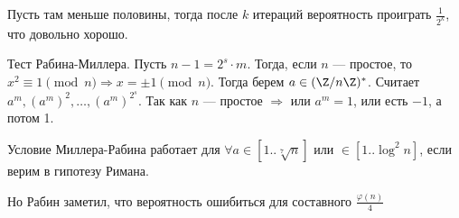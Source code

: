 Пусть там меньше половины, тогда после $k$ итераций вероятность проиграть  $\frac{1}{2^k}$, что довольно хорошо.

Тест Рабина-Миллера. Пусть $n-1 = 2^s \cdot m$. Тогда, если  $n$ --- простое, то  $x^2 \equiv 1 \pmod{n} \Rightarrow x = \pm 1 \pmod{n}$. Тогда берем  $a \in (\Z / n \Z)^*$. Считает  $a^m, (a^m)^2, \ldots, (a^m)^{2^s}$. Так как $n$ --- простое  $\Rightarrow$ или $a^m = 1$, или есть  $-1$, а потом 1. 

Условие Миллера-Рабина работает для  $\forall a \in [1..\sqrt[7]{n}]$ или  $\in [1..\log^2 n]$, если верим в гипотезу Римана. 

Но Рабин заметил, что вероятность ошибиться для составного $\frac{\varphi(n)}{4}$ 

